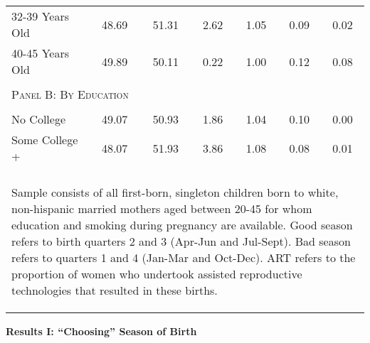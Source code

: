 \documentclass[10pt,letterpaper,subeqn]{beamer}
\begin{document}
\begin{frame}
\begin{table}[htpb!]
\begin{center}
{\begin{tabular}{lcccccc}
\\
32-39 Years Old&48.69&51.31&2.62&1.05&0.09&0.02
\\
40-45 Years Old&49.89&50.11&0.22&1.00&0.12&0.08
\\
 &&&&&& \\\multicolumn{7}{l}{\textsc{Panel B: By Education}}\\
\begin{footnotesize}\end{footnotesize}&
\begin{footnotesize}\end{footnotesize}&
\begin{footnotesize}\end{footnotesize}&
\begin{footnotesize}\end{footnotesize}&
\begin{footnotesize}\end{footnotesize}\\
No College&49.07&50.93&1.86&1.04&0.10&0.00
\\
Some College +&48.07&51.93&3.86&1.08&0.08&0.01
\\
 &&&&&& \\
\midrule\multicolumn{7}{p{11.4cm}}{\begin{footnotesize}Sample consists of all first-born, singleton children born to white, non-hispanic married mothers aged between 20-45 for whom     education and smoking during pregnancy are available. Good season refers to birth quarters 2 and 3 (Apr-Jun and Jul-Sept).  Bad season refers to quarters 1 and 4 (Jan-Mar and Oct-Dec). ART refers to the proportion of  women who undertook assisted reproductive technologies that resulted in these births.
\end{footnotesize}} \\ \bottomrule
 \end{tabular}}\end{center}\end{table}
\end{frame}

\begin{frame}
  \begin{center}
    \textbf{Results I: ``Choosing'' Season of Birth}
  \end{center}
\end{frame}
\end{document}
